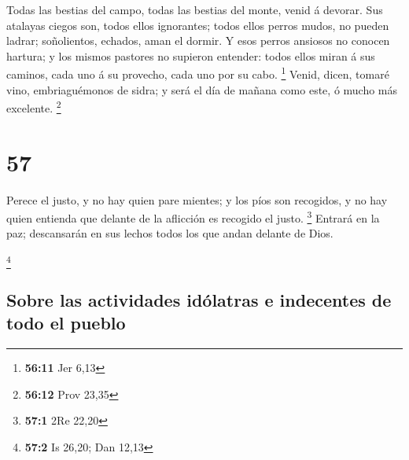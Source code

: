  Todas las bestias del campo, todas las bestias del monte,
venid á devorar.  Sus atalayas ciegos son, todos ellos
ignorantes; todos ellos perros mudos, no pueden ladrar; soñolientos,
echados, aman el dormir.  Y esos perros ansiosos no
conocen hartura; y los mismos pastores no supieron entender: todos ellos
miran á sus caminos, cada uno á su provecho, cada uno por su cabo.
\footnote{\textbf{56:11} Jer 6,13}  Venid, dicen, tomaré
vino, embriaguémonos de sidra; y será el día de mañana como este, ó
mucho más excelente. \footnote{\textbf{56:12} Prov 23,35}

\hypertarget{section-56}{%
\section{57}\label{section-56}}

 Perece el justo, y no hay quien pare mientes; y los píos
son recogidos, y no hay quien entienda que delante de la aflicción es
recogido el justo. \footnote{\textbf{57:1} 2Re 22,20} 
Entrará en la paz; descansarán en sus lechos todos los que andan delante
de Dios.

\footnote{\textbf{57:2} Is 26,20; Dan 12,13}

\hypertarget{sobre-las-actividades-iduxf3latras-e-indecentes-de-todo-el-pueblo}{%
\subsection{Sobre las actividades idólatras e indecentes de todo el
pueblo}\label{sobre-las-actividades-iduxf3latras-e-indecentes-de-todo-el-pueblo}}

